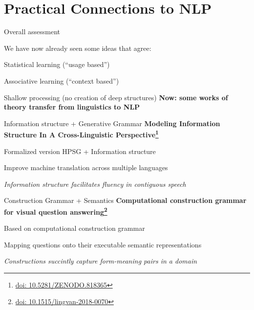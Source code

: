 \documentclass[aspectratio=169,cramped]{beamer}
\let\tempone\itemize
\let\temptwo\enditemize
\renewenvironment{itemize}{\tempone\addtolength{\itemsep}{-0\baselineskip}\addtolength{\parskip}{-0.2\baselineskip}}{\temptwo}
\newcommand*{\doi}[1]{\href{http://doai.io/#1}{doi: #1}}
\begin{document}
\section{Practical Connections to NLP}

\begin{frame}{Overall assessment}
  \begin{itemize}
  \item We have now already seen some ideas that agree:
    \begin{itemize}
    \item Statistical learning (``usage based'')
    \item Associative learning (``context based'')
    \item Shallow processing (no creation of deep structures)
    \end{itemize}
  \end{itemize}
  \textbf{Now: some works of theory transfer from linguistics to NLP}
\end{frame}

\begin{frame}{Information structure + Generative Grammar}
	\textbf{Modeling Information Structure In A Cross-Linguistic Perspective\footnote{\protect\doi{10.5281/ZENODO.818365}}}
  \begin{itemize}
  \item Formalized version HPSG + Information structure
  \item Improve machine translation across multiple languages
  \item \textit{Information structure facilitates fluency in contiguous speech}
  \end{itemize}
\end{frame}

\begin{frame}{Construction Grammar + Semantics}
	\textbf{Computational construction grammar for visual question answering\footnote{\protect\doi{10.1515/lingvan-2018-0070}}}
  \begin{itemize}
  \item Based on computational construction grammar
  \item Mapping questions onto their executable semantic representations
  \item \textit{Constructions succintly capture form-meaning pairs in a domain}
  \end{itemize}
\end{frame}
\end{document}
